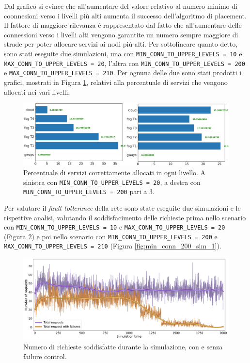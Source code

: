 Dal grafico si evince che all'aumentare del valore relativo al numero minimo di coonnesioni verso i livelli più alti aumenta il successo dell'algoritmo di placement. Il fattore di maggiore rilevanza è rappresentato dal fatto che all'aumentare delle connessioni verso i livelli alti vengono garantite un numero sempre maggiore di strade per poter allocare servizi ai nodi più alti. Per sottolineare quanto detto, sono stati eseguite due simulazioni, una con \texttt{MIN\_CONN\_TO\_UPPER\_LEVELS = 10} e \texttt{MAX\_CONN\_TO\_UPPER\_LEVELS = 20}, l'altra con \texttt{MIN\_CONN\_TO\_UPPER\_LEVELS = 200} e \texttt{MAX\_CONN\_TO\_UPPER\_LEVELS = 210}. Per ognuna delle due sono stati prodotti i grafici, mostrati in Figura \ref{fig:min_conn_to_upper_levels_comparison}, relativi alla percentuale di servizi che vengono allocati nei vari livelli.

\begin{figure}[!ht]
  \includegraphics[width=14cm]{images/min_conn_to_upper_levels_comparison}
  \centering
  \caption{Percentuale di servizi correttamente allocati in ogni livello. A sinistra con \texttt{MIN\_CONN\_TO\_UPPER\_LEVELS = 20}, a destra con \texttt{MIN\_CONN\_TO\_UPPER\_LEVELS = 200} pari a 3.}
  \label{fig:min_conn_to_upper_levels_comparison}
\end{figure}

Per valutare il \textit{fault tollerance} della rete sono state eseguite due simulazioni e le rispettive analisi, valutando il soddisfacimento delle richieste prima nello scenario con \texttt{MIN\_CONN\_TO\_UPPER\_LEVELS = 10} e \texttt{MAX\_CONN\_TO\_UPPER\_LEVELS = 20} (Figura \ref{fig:min_conn_20_sim_2}) e poi nello scenario con \texttt{MIN\_CONN\_TO\_UPPER\_LEVELS = 200} e \texttt{MAX\_CONN\_TO\_UPPER\_LEVELS = 210} (Figura \ref{fig:min_conn_200_sim_1}).

\begin{figure}[!ht]
  \includegraphics[width=14cm]{images/min_conn_10_sim_2}
  \centering
  \caption{Numero di richieste soddisfatte durante la simulazione, con e senza failure control.}
  \label{fig:min_conn_20_sim_2}
\end{figure}

